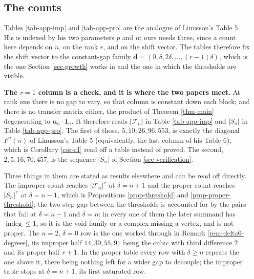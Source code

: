 \documentclass[11pt, a4paper, abstract=yes]{scrartcl}
\theoremstyle{definition}
\theoremstyle{remark}
\theoremstyle{plain}
\newcommand{\vek}[1]{\boldsymbol{#1}}
\newcommand{\indeg}{\operatorname{indeg}}
\begin{document}
\subsection{The counts}
\label{sec:orgabd7e94}

Tables \ref{tab-app-imp} and \ref{tab-app-pro} are the analogue of
Linusson's Table 5. His is indexed by his two parameters \(p\) and \(n\); ours needs three, since
a count here depends on \(n\), on the rank \(r\), and on the shift vector. The tables therefore
fix the shift vector to the constant-gap family
\(\vek d=(0,\delta,2\delta,\dots,(r-1)\delta)\), which is the one Section \ref{sec-growth} works
in and the one in which the thresholds are visible.

\textbf{The \(r=1\) column is a check, and it is where the two papers meet.} At rank one there is no
gap to vary, so that column is constant down each block; and there is no transfer matrix either,
the product of Theorem \ref{thm-main} degenerating to \(\vek u_n\cdot\vek 1_n\). It therefore reads
\(\lvert\mathcal F_n\rvert\) in Table \ref{tab-app-imp} and \(\lvert S_n\rvert\) in
Table \ref{tab-app-pro}. The first of those, \(5,10,26,96,553\), is exactly the
diagonal \(F^n(n)\) of Linusson's Table 5 (equivalently, the last column of his Table 6), which
is Corollary \ref{cor-r1} read off a table instead of proved. The second, \(2,5,16,70,457\), is the
sequence \(\lvert S_n\rvert\) of Section \ref{sec-verification}.

Three things in them are stated as results elsewhere and can be read off directly. The improper
count reaches \(\lvert\mathcal F_n\rvert^{\,r}\) at \(\delta=n+1\) and the proper count reaches
\(\lvert S_n\rvert^{\,r}\) at \(\delta=n-1\), which is Propositions \ref{prop-threshold} and
\ref{prop-proper-threshold}; the two-step gap between the thresholds is accounted for by the pairs
that fail at \(\delta=n-1\) and \(\delta=n\): in every one of them the later summand has
\(\indeg\le1\), so it is the void family or a complex missing a vertex, and is not proper. The \(n=2\), \(\delta=0\) row is the one worked through in
Remark \ref{rem-delta0-degrees}, its improper half \(14,30,55,91\) being the cubic with third
difference \(2\) and its proper half \(r+1\). In the proper table every row with \(\delta\ge n\)
repeats the one above it, there being nothing left for a wider gap to decouple; the improper table
stops at \(\delta=n+1\), its first saturated row.
\end{document}
